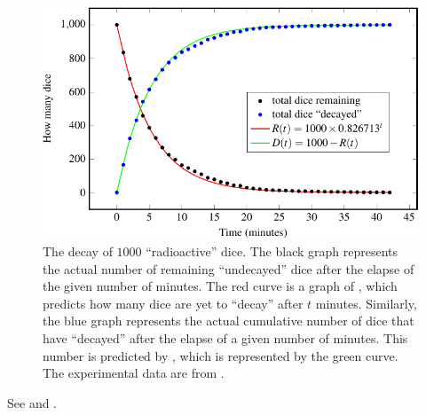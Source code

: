 \documentclass[a4paper,oneside,12pt]{article}
\begin{document}
\begin{problem}
{\begin{solution}
\begin{figure}[!htbp]
\centering
\includegraphics[scale=1.1]{image/11/radioactive-dice.pdf}
\caption{%
  The decay of $1000$ ``radioactive'' dice.  The black graph
  represents the actual number of remaining ``undecayed'' dice after
  the elapse of the given number of minutes.  The red curve is a graph
  of , which
  predicts how many dice are yet to ``decay'' after $t$ minutes.
  Similarly, the blue graph represents the actual cumulative number of
  dice that have ``decayed'' after the elapse of a given number of
  minutes.  This number is predicted by
  , which is represented
  by the green curve.  The experimental data are from
  .
}
\label{fig:radioactive_dice}
\end{figure}

See  and
.

\begin{table}[!htbp]
\centering

\caption{%
  This is the same as , but with the
  addition of columns for the cumulative sum of dice that have
  ``decayed''.
}
\label{tab:radioactive_dice_cumulative_decayed}
\end{table}


\end{solution}}
\end{problem}
\end{document}
